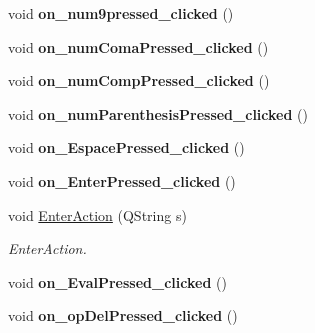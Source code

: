 \begin{DoxyCompactItemize}
\item 
\hypertarget{class_main_window_a0cab16c3686e3d755863663d16c26b76}{void {\bfseries on\-\_\-num9pressed\-\_\-clicked} ()}\label{class_main_window_a0cab16c3686e3d755863663d16c26b76}

\item 
\hypertarget{class_main_window_a620b213e5bebf1328f0a7756cfe851cf}{void {\bfseries on\-\_\-num\-Coma\-Pressed\-\_\-clicked} ()}\label{class_main_window_a620b213e5bebf1328f0a7756cfe851cf}

\item 
\hypertarget{class_main_window_ad07ce65219af80a1fa925d2cb061fe42}{void {\bfseries on\-\_\-num\-Comp\-Pressed\-\_\-clicked} ()}\label{class_main_window_ad07ce65219af80a1fa925d2cb061fe42}

\item 
\hypertarget{class_main_window_a5507fa5208ea9a0e8b41b2051298bd4b}{void {\bfseries on\-\_\-num\-Parenthesis\-Pressed\-\_\-clicked} ()}\label{class_main_window_a5507fa5208ea9a0e8b41b2051298bd4b}

\item 
\hypertarget{class_main_window_a23b4ec3fa1b80ad6d1834452acb17712}{void {\bfseries on\-\_\-\-Espace\-Pressed\-\_\-clicked} ()}\label{class_main_window_a23b4ec3fa1b80ad6d1834452acb17712}

\item 
\hypertarget{class_main_window_a8de038acfcf2ed9220b23325adba79fc}{void {\bfseries on\-\_\-\-Enter\-Pressed\-\_\-clicked} ()}\label{class_main_window_a8de038acfcf2ed9220b23325adba79fc}

\item 
void \hyperlink{class_main_window_aa3db30ce633923526257edb912a8a39e}{Enter\-Action} (Q\-String s)
\begin{DoxyCompactList}\small\item\em Enter\-Action. \end{DoxyCompactList}\item 
\hypertarget{class_main_window_a239b62eeb64ad6c641dfed0ae289b972}{void {\bfseries on\-\_\-\-Eval\-Pressed\-\_\-clicked} ()}\label{class_main_window_a239b62eeb64ad6c641dfed0ae289b972}

\item 
\hypertarget{class_main_window_a47a8effb3786f95afec25f40f975a46e}{void {\bfseries on\-\_\-op\-Del\-Pressed\-\_\-clicked} ()}\label{class_main_window_a47a8effb3786f95afec25f40f975a46e}


\end{DoxyCompactItemize}
